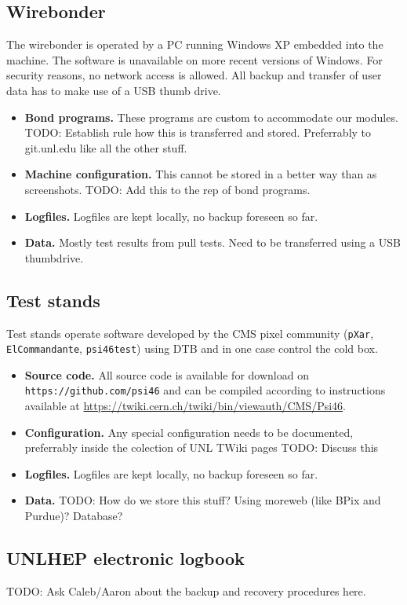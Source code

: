 \documentclass[12pt]{unlsilabsop}
\begin{document}
\subsection{Wirebonder}
The wirebonder is operated by a PC running Windows XP embedded into the machine. The software is unavailable on more recent versions of Windows. For security reasons, no network access is allowed. All backup and transfer of user data has to make use of a USB thumb drive.
\begin{itemize}
    \item \textbf{Bond programs.} These programs are custom to accommodate our modules. TODO: Establish rule how this is transferred and stored. Preferrably to git.unl.edu like all the other stuff.
    \item \textbf{Machine configuration.} This cannot be stored in a better way than as screenshots. TODO: Add this to the rep of bond programs.
    \item \textbf{Logfiles.} Logfiles are kept locally, no backup foreseen so far.
    \item \textbf{Data.} Mostly test results from pull tests. Need to be transferred using a USB thumbdrive.
\end{itemize}

\subsection{Test stands}
Test stands operate software developed by the CMS pixel community (\texttt{pXar}, \texttt{ElCommandante}, \texttt{psi46test}) using DTB and in one case control the cold box.
\begin{itemize}
    \item \textbf{Source code.} All source code is available for download on \texttt{https://github.com/psi46} and can be compiled according to instructions available at \url{https://twiki.cern.ch/twiki/bin/viewauth/CMS/Psi46}.
    \item \textbf{Configuration.} Any special configuration needs to be documented, preferrably inside the colection of UNL TWiki pages TODO: Discuss this
    \item \textbf{Logfiles.} Logfiles are kept locally, no backup foreseen so far.
    \item \textbf{Data.} TODO: How do we store this stuff? Using moreweb (like BPix and Purdue)? Database?
\end{itemize}

\subsection{UNLHEP electronic logbook}
TODO: Ask Caleb/Aaron about the backup and recovery procedures here.
\end{document}
